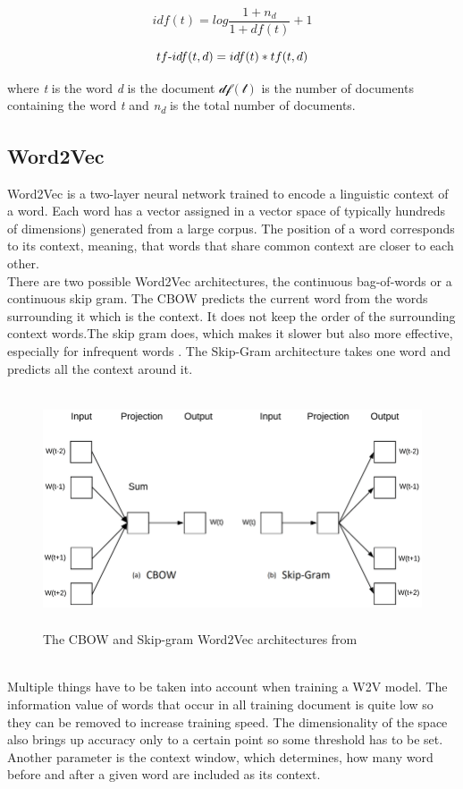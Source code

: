\begin{equation}
idf(t) = log\frac{1+n_d}{1+df(t)} + 1
\end{equation}

\begin{equation}
tf\textnormal{-}idf(t,d) = idf(t)*tf(t,d) 
\end{equation}

where \textit{t} is the word \textit{d} is the document $ \mathcal{df(t)}$ is the number of documents containing the word \textit{t} and \textit{n\textsubscript{d}} is the total number of documents. 

\subsection{Word2Vec}
Word2Vec is a two-layer neural network trained to encode a linguistic context of a word. Each word has a vector assigned in a vector space of typically hundreds of dimensions) generated from a large corpus. The position of a word corresponds to its context, meaning, that words that share common context are closer to each other. \\
There are two possible Word2Vec architectures, the continuous bag-of-words or a continuous skip gram. The CBOW predicts the current word from the words surrounding it which is the context. It does not keep the order of the surrounding context words.The skip gram does, which makes it slower but also more effective, especially for infrequent words \cite{DBLP:journals/corr/abs-1301-3781}. The Skip-Gram architecture takes one word and predicts all the context around it.
\begin{figure}[h]
    \centering
	\includegraphics[height=70mm]{./img/cbow_skipgram_w2v_architecture.png}
	\caption{The CBOW and Skip-gram Word2Vec architectures from \cite{phdthesis}}
	\label{fig:cbow_skipgram_w2v_architecture}
\end{figure}
\\
Multiple things have to be taken into account when training a W2V model. The information value of words that occur in all training document is quite low so they can be removed to increase training speed. The dimensionality of the space also brings up accuracy only to a certain point so some threshold has to be set. Another parameter is the context window, which determines, how many word before and after a given word are included as its context.

